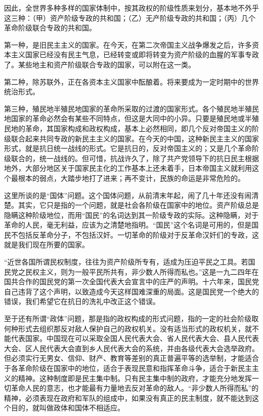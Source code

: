 因此，全世界多种多样的国家体制中，按其政权的阶级性质来划分，基本地不外乎这三种：（甲）资产阶级专政的共和国；（乙）无产阶级专政的共和国；（丙）几个革命阶级联合专政的共和国。

第一种，是旧民主主义的国家。在今天，在第二次帝国主义战争爆发之后，许多资本主义国家已经没有民主气息，已经转变或即将转变为资产阶级的血腥的军事专政了。某些地主和资产阶级联合专政的国家，可以附在这一类。

第二种，除苏联外，正在各资本主义国家中酝酿着。将来要成为一定时期中的世界统治形式。

第三种，殖民地半殖民地国家的革命所采取的过渡的国家形式。各个殖民地半殖民地国家的革命必然会有某些不同特点，但这是大同中的小异。只要是殖民地或半殖民地的革命，其国家构成和政权构成，基本上必然相同，即几个反对帝国主义的阶级联合起来共同专政的新民主主义的国家。在今天的中国，这种新民主主义的国家形式，就是抗日统一战线的形式。它是抗日的，反对帝国主义的；又是几个革命阶级联合的，统一战线的。但可惜，抗战许久了，除了共产党领导下的抗日民主根据地外，大部分地区关于国家民主化的工作基本上还未着手，日本帝国主义就利用这个最根本的弱点，大踏步地打了进来；再不变计，民族的命运是非常危险的。

这里所谈的是“国体”问题。这个国体问题，从前清末年起，闹了几十年还没有闹清楚。其实，它只是指的一个问题，就是社会各阶级在国家中的地位。资产阶级总是隐瞒这种阶级地位，而用“国民”的名词达到其一阶级专政的实际。这种隐瞒，对于革命的人民，毫无利益，应该为之清楚地指明。“国民”这个名词是可用的，但是国民不包括反革命分子，不包括汉奸。一切革命的阶级对于反革命汉奸们的专政，这就是我们现在所要的国家。

“近世各国所谓民权制度，往往为资产阶级所专有，适成为压迫平民之工具。若国民党之民权主义，则为一般平民所共有，非少数人所得而私也。”这是一九二四年在国共合作的国民党的第一次全国代表大会宣言中的庄严的声明。十六年来，国民党自己违背了这个声明，以致造成今天这样国难深重的局面。这是国民党一个绝大的错误，我们希望它在抗日的洗礼中改正这个错误。

至于还有所谓“政体”问题，那是指的政权构成的形式问题，指的一定的社会阶级取何种形式去组织那反对敌人保护自己的政权机关。没有适当形式的政权机关，就不能代表国家。中国现在可以采取全国人民代表大会、省人民代表大会、县人民代表大会、区人民代表大会直到乡人民代表大会的系统，并由各级代表大会选举政府。但必须实行无男女、信仰、财产、教育等差别的真正普遍平等的选举制，才能适合于各革命阶级在国家中的地位，适合于表现民意和指挥革命斗争，适合于新民主主义的精神。这种制度即是民主集中制。只有民主集中制的政府，才能充分地发挥一切革命人民的意志，也才能最有力量地去反对革命的敌人。“非少数人所得而私”的精神，必须表现在政府和军队的组成中，如果没有真正的民主制度，就不能达到这个目的，就叫做政体和国体不相适应。

